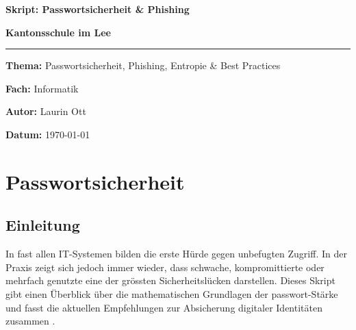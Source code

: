 \documentclass[12pt,a4paper]{article}
\begin{document}
\begin{titlepage}
    \centering
    \vspace*{2cm}
    
    {\Huge \textbf{Skript: Passwortsicherheit \& Phishing} \par}
    \vspace{1.5cm}
    {\Large \textbf{Kantonsschule im Lee} \par}
    \vspace{2cm}
    
    \rule{\linewidth}{0.5mm}
    \vspace{2cm}
    
    {\large \textbf{Thema:} Passwortsicherheit, Phishing, Entropie \& Best Practices \par}
    \vspace{0.5cm}
    {\large \textbf{Fach:} Informatik \par}
    \vspace{0.5cm}
    {\large \textbf{Autor:} Laurin Ott \par}
    
    \vfill
    
    {\large \textbf{Datum:} \today \par}
\end{titlepage}

\newpage
{}
\tableofcontents
\newpage

\section{Passwortsicherheit}
\label{sec:passwortsicherheit}

\subsection{Einleitung}
In fast allen IT-Systemen bilden  die erste Hürde gegen unbefugten Zugriff. In der Praxis zeigt sich jedoch immer wieder, dass schwache, kompromittierte oder mehrfach genutzte  eine der grössten Sicherheitslücken darstellen. Dieses Skript gibt einen Überblick über die mathematischen Grundlagen der \gls{passwort}-Stärke und fasst die aktuellen Empfehlungen zur Absicherung digitaler Identitäten zusammen \cite{nist2025}.
\end{document}
